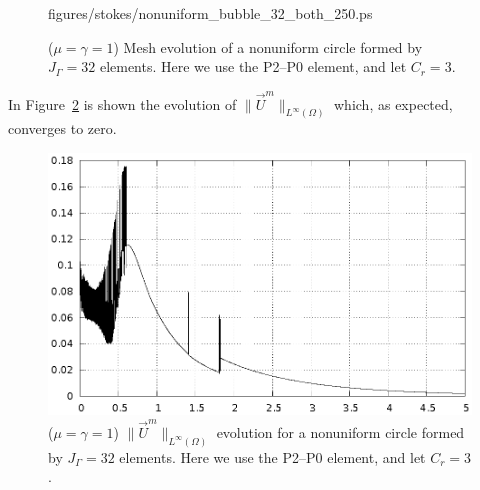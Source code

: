 \begin{figure}[htbp]
{{figures/stokes/nonuniform_bubble_32_both_250.ps}}
\caption[Stokes equidistribution property]
{($\mu=\gamma=1$) Mesh evolution of a nonuniform circle formed by
$J_\Gamma = 32$ elements. Here we use the P2--P0 element, and let $C_r = 3$.}
\label{fig:nonuniform_bubble_32_both}
\end{figure}
In Figure~\ref{fig:nonuniform_bubble_velocity_32_both} is shown the evolution of
$\|\vec U^m\|_{L^\infty(\Omega)}$ which, as expected, converges to zero.
\begin{figure}[htbp]
\centering
\includegraphics[width=.45\textwidth]
{figures/stokes/nonuniform_bubble_velocity_32_both.ps}
\caption[Stokes equidistribution velocity]
{($\mu=\gamma=1$) $\|\vec U^m\|_{L^\infty(\Omega)}$ evolution for a nonuniform
circle formed by $J_\Gamma = 32$ elements. Here we use the P2--P0 element, and
let $C_r = 3$.}
\label{fig:nonuniform_bubble_velocity_32_both}
\end{figure}

